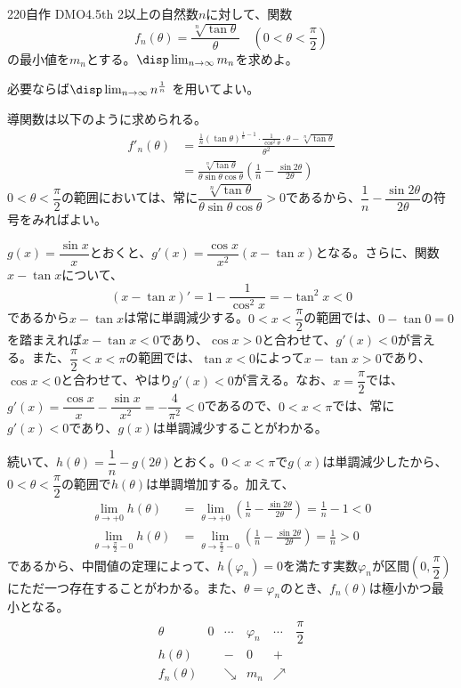 \begin{prob}{220}{}{自作 DMO4.5th}
 2以上の自然数$n$に対して、関数
 \[ f_n(\theta)=\frac{\sqrt[n]{\tan\theta}}{\theta} \quad (0<\theta<\frac{\pi}{2}) \]
 の最小値を$m_n$とする。$\disp \lim_{n\to\infty} m_n$を求めよ。

 必要ならば$\disp \lim_{n\to\infty} n^{\frac{1}{n}}$ を用いてよい。
\end{prob}

導関数は以下のように求められる。
\begin{align*}
 f'_n(\theta)&=\frac{\frac{1}{n}(\tan\theta)^{\frac{1}{n}-1}\cdot\frac{1}{\cos^2\theta}\cdot\theta-\sqrt[n]{\tan\theta}}{\theta^2} \\
 &=\frac{\sqrt[n]{\tan\theta}}{\theta\sin\theta\cos\theta}\left(\frac{1}{n}-\frac{\sin 2\theta}{2\theta}\right)
\end{align*}
$0<\theta<\dfrac{\pi}{2}$の範囲においては、常に$\dfrac{\sqrt[n]{\tan\theta}}{\theta\sin\theta\cos\theta}>0$であるから、$\dfrac{1}{n}-\dfrac{\sin 2\theta}{2\theta}$の符号をみればよい。

$g(x)=\dfrac{\sin x}{x}$とおくと、$g'(x)=\dfrac{\cos x}{x^2}(x-\tan x)$となる。さらに、関数$x-\tan x$について、
\[ (x-\tan x)'=1-\frac{1}{\cos^2 x}=-\tan^2 x < 0 \]
であるから$x-\tan x$は常に単調減少する。$0<x<\dfrac{\pi}{2}$の範囲では、$0-\tan 0=0$を踏まえれば$x-\tan x<0$であり、$\cos x>0$と合わせて、$g'(x)<0$が言える。また、$\dfrac{\pi}{2}<x<\pi$の範囲では、$\tan x<0$によって$x-\tan x>0$であり、$\cos x<0$と合わせて、やはり$g'(x)<0$が言える。なお、$x=\dfrac{\pi}{2}$では、$g'(x)=\dfrac{\cos x}{x}-\dfrac{\sin x}{x^2}=-\dfrac{4}{\pi^2}<0$であるので、$0<x<\pi$では、常に$g'(x)<0$であり、$g(x)$は単調減少することがわかる。

続いて、$h(\theta)=\dfrac{1}{n}-g(2\theta)$とおく。$0<x<\pi$で$g(x)$は単調減少したから、$0<\theta<\dfrac{\pi}{2}$の範囲で$h(\theta)$は単調増加する。加えて、
\begin{align*}
 \lim_{\theta\to +0} h(\theta)&=\lim_{\theta\to +0} \left(\frac{1}{n}-\frac{\sin 2\theta}{2\theta}\right)=\frac{1}{n}-1 < 0 \\
 \lim_{\theta\to \frac{\pi}{2}-0}h(\theta)&=\lim_{\theta\to \frac{\pi}{2}-0} \left(\frac{1}{n}-\frac{\sin 2\theta}{2\theta}\right)=\frac{1}{n}>0
\end{align*}
であるから、中間値の定理によって、$h(\varphi_n)=0$を満たす実数$\varphi_n$が区間$\left(0, \dfrac{\pi}{2}\right)$にただ一つ存在することがわかる。また、$\theta=\varphi_n$のとき、$f_n(\theta)$は極小かつ最小となる。
\begin{align*}
 \begin{array}{c|c|c|c|c|c}
  \theta & 0 & \cdots & \varphi_n & \cdots & \dfrac{\pi}{2} \\[1.0ex] \hline
  h(\theta) & & - & 0 & + & \\[1.0ex] \hline
  f_n(\theta) & & \searrow & m_n & \nearrow & \\
 \end{array}
\end{align*}

